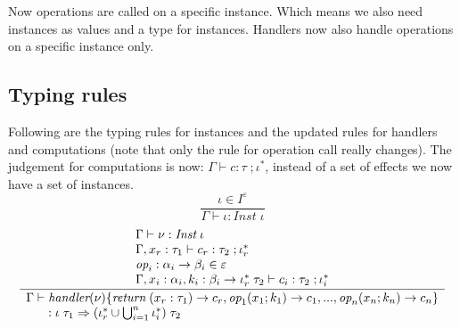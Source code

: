 \documentclass[12pt]{article}
\newcommand\eff[0]{\varepsilon}
\newcommand\eop[0]{\textit{op}}
\newcommand\insts[1]{I^{#1}}
\newcommand\inst[0]{\iota}
\newcommand\instss[0]{\inst^*}
\newcommand\type[0]{\tau}
\newcommand\tarr[2]{#1 \rightarrow #2}
\newcommand\tarre[3]{#1 \rightarrow #2 \; #3}
\newcommand\thandler[4]{#1 \; #2 \Rightarrow #3 \; #4}
\newcommand\tinst[1]{\textit{Inst} \; #1}
\newcommand\val[0]{\nu}
\newcommand\vhandleri[2]{\textit{handler} (#1) \{#2\}}
\newcommand\comp[0]{c}
\begin{document}
Now operations are called on a specific instance. Which means we also need instances as values and a type for instances. Handlers now also handle operations on a specific instance only.

\subsection{Typing rules}
Following are the typing rules for instances and the updated rules for handlers and computations (note that only the rule for operation call really changes).
The judgement for computations is now: 
$\Gamma \vdash \comp : \type \; ; \instss$, instead of a set of effects we now have a set of instances. \\
\[\frac{
	\inst \in \insts{\eff}
}{
	\Gamma \vdash \inst : \tinst{\inst}
}\]
\vspace{10pt}
\[\frac{
	\begin{array}{l}
	\Gamma \vdash \val : \tinst{\inst} \\
	\Gamma , x_r : \type_1 \vdash \comp_r : \type_2 \; ; \instss_r \\
	\eop_i : \tarr{\alpha_i}{\beta_i} \in \eff \\
	\Gamma , x_i : \alpha_i , k_i : \tarre{\beta_i}{\instss_r}{\type_2} \vdash \comp_i : \type_2 \; ; \instss_i
	\end{array}
}{
	\begin{array}{l}
	\Gamma \vdash \vhandleri{\val}{
		\textit{return} \; (x_r:\type_1) \rightarrow \comp_r,
		\eop_1 ( x_1 ; k_1 ) \rightarrow \comp_1,
		...,
		\eop_n ( x_n ; k_n ) \rightarrow \comp_n
	} \\ \indent : \thandler{\inst}{\type_1}{(\instss_r \cup \bigcup_{i=1}^n \instss_i)}{\type_2}
	\end{array}
}\]
\end{document}
